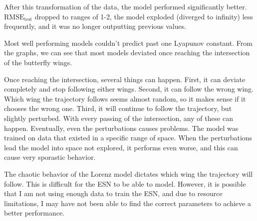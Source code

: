 \documentclass{article}
\begin{document}
After this transformation of the data, the model performed significantly
better. $\text{RMSE}_\text{test}$ dropped to ranges of 1-2, the
model exploded (diverged to infinity) less frequently, and it was no
longer outputting previous values.

Most well performing models couldn't predict past one Lyapunov constant. 
From the graphs, we can see that most models deviated once reaching the
intersection of the butterfly wings.

Once reaching the intersection,
several things can happen. First, it can deviate completely and stop
following either wings. Second, it can follow the wrong wing. Which wing
the trajectory follows seems almost random, so it makes sense if it
chooses the wrong one. Third, it will continue to follow the trajectory,
but slightly perturbed. With every passing of the intersection, any of
these can happen. Eventually, even the perturbations causes problems. 
The model was trained on data that existed in a specific range of space. 
When the perturbations lead the model into space not explored, 
it performs even worse, and this can cause very sporastic behavior.

The chaotic behavior of the Lorenz model dictates which wing the
trajectory will follow. This is difficult for the ESN to be able to
model. However, it is possible that I am not using enough data to train
the ESN, and due to resource limitations, I may have not been able to find
the correct parameters to achieve a better performance.
\end{document}
